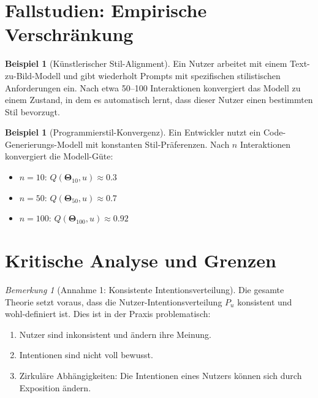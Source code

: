 \documentclass[12pt, a4paper]{article}
\theoremstyle{definition}
\newtheorem{example}[theorem]{Beispiel}
\theoremstyle{remark}
\newtheorem{remark}[theorem]{Bemerkung}
\newcommand{\vTheta}{\bm{\Theta}}
\begin{document}
\section{Fallstudien: Empirische Verschränkung}
\label{sec:fallstudien}

\begin{example}[Künstlerischer Stil-Alignment]
\label{ex:artistic_style}
Ein Nutzer arbeitet mit einem Text-zu-Bild-Modell und gibt wiederholt Prompts mit spezifischen stilistischen Anforderungen ein. Nach etwa 50--100 Interaktionen konvergiert das Modell zu einem Zustand, in dem es automatisch lernt, dass dieser Nutzer einen bestimmten Stil bevorzugt.
\end{example}

\begin{example}[Programmierstil-Konvergenz]
\label{ex:code_style}
Ein Entwickler nutzt ein Code-Generierungs-Modell mit konstanten Stil-Präferenzen. Nach $n$ Interaktionen konvergiert die Modell-Güte:
\begin{itemize}
  \item $n = 10$: $Q(\vTheta_{10}, u) \approx 0.3$
  \item $n = 50$: $Q(\vTheta_{50}, u) \approx 0.7$
  \item $n = 100$: $Q(\vTheta_{100}, u) \approx 0.92$
\end{itemize}
\end{example}

\section{Kritische Analyse und Grenzen}
\label{sec:kritik}

\begin{remark}[Annahme 1: Konsistente Intentionsverteilung]
\label{rem:assumption_consistency}
Die gesamte Theorie setzt voraus, dass die Nutzer-Intentionsverteilung $P_u$ konsistent und wohl-definiert ist. Dies ist in der Praxis problematisch:
\begin{enumerate}[label=(\alph*)]
  \item Nutzer sind inkonsistent und ändern ihre Meinung.
  \item Intentionen sind nicht voll bewusst.
  \item Zirkuläre Abhängigkeiten: Die Intentionen eines Nutzers können sich durch Exposition ändern.
\end{enumerate}
\end{remark}
\end{document}
